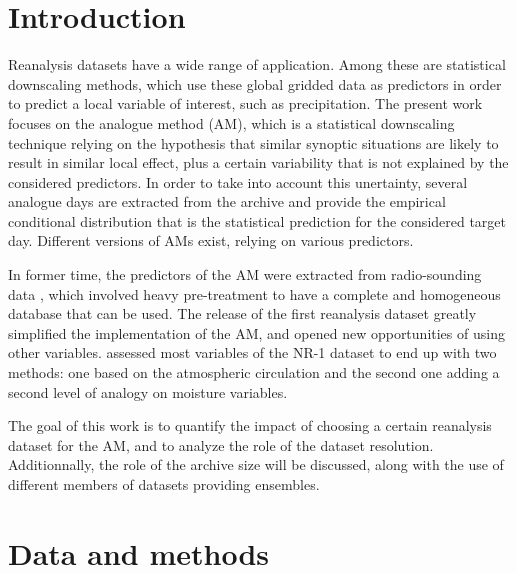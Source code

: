\documentclass{ametsoc}
\begin{document}



\section{Introduction}

Reanalysis datasets have a wide range of application. Among these are statistical downscaling methods, which use these global gridded data as predictors in order to predict a local variable of interest, such as precipitation. The present work focuses on the analogue method (AM), which is a statistical downscaling technique relying on the hypothesis that similar synoptic situations are likely to result in similar local effect, plus a certain variability that is not explained by the considered predictors. In order to take into account this unertainty, several analogue days are extracted from the archive and provide the empirical conditional distribution that is the statistical prediction for the considered target day. Different versions of AMs exist, relying on various predictors. 

In former time, the predictors of the AM were extracted from radio-sounding data \citep{Duband1981}, which involved heavy pre-treatment to have a complete and homogeneous database that can be used. The release of the first reanalysis dataset \citep[NCEP/NCAR Reanalysis I, NR-1][]{Kalnay1996, Kistler2001} greatly simplified the implementation of the AM, and opened new opportunities of using other variables. \citet{Bontron2004} assessed most variables of the NR-1 dataset to end up with two methods: one based on the atmospheric circulation and the second one adding a second level of analogy on moisture variables.



The goal of this work is to quantify the impact of choosing a certain reanalysis dataset for the AM, and to analyze the role of the dataset resolution. Additionnally, the role of the archive size will be discussed, along with the use of different members of datasets providing ensembles.


\section{Data and methods}
\label{sec:data}
\end{document}
